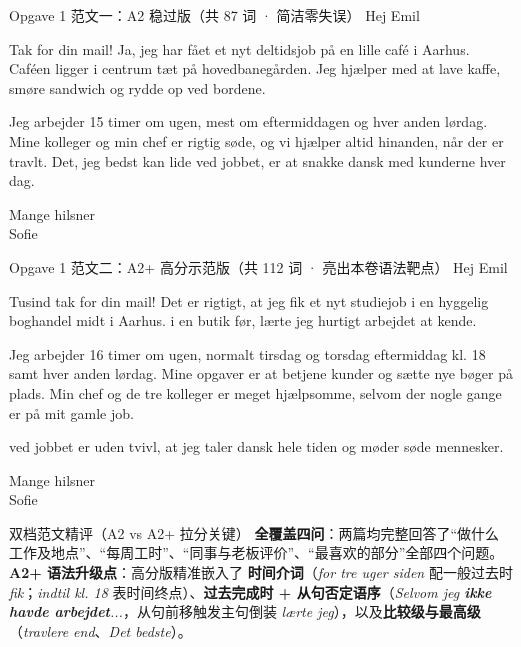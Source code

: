 \begin{emailbox}{Opgave 1 范文一：A2 稳过版（共 87 词 · 简洁零失误）}
Hej Emil

Tak for din mail! Ja, jeg har fået et nyt deltidsjob på en lille café i Aarhus. Caféen ligger i centrum tæt på hovedbanegården. Jeg hjælper med at lave kaffe, smøre sandwich og rydde op ved bordene.

Jeg arbejder 15 timer om ugen, mest om eftermiddagen og hver anden lørdag. Mine kolleger og min chef er rigtig søde, og vi hjælper altid hinanden, når der er travlt. Det, jeg bedst kan lide ved jobbet, er at snakke dansk med kunderne hver dag.

Mange hilsner\\
Sofie
\end{emailbox}

\begin{emailbox}{Opgave 1 范文二：A2+ 高分示范版（共 112 词 · 亮出本卷语法靶点）}
Hej Emil

Tusind tak for din mail! Det er rigtigt, at jeg  fik et nyt studiejob i en hyggelig boghandel midt i Aarhus.  i en butik før, lærte jeg hurtigt arbejdet at kende.

Jeg arbejder 16 timer om ugen, normalt tirsdag og torsdag eftermiddag  kl. 18 samt hver anden lørdag. Mine opgaver er at betjene kunder og sætte nye bøger på plads. Min chef og de tre kolleger er meget hjælpsomme, selvom der nogle gange er  på mit gamle job.

 ved jobbet er uden tvivl, at jeg taler dansk hele tiden og møder søde mennesker.

Mange hilsner\\
Sofie
\end{emailbox}

\begin{tipbox}{双档范文精评（A2 vs A2+ 拉分关键）}
\small
{} \textbf{全覆盖四问}：两篇均完整回答了“做什么工作及地点”、“每周工时”、“同事与老板评价”、“最喜欢的部分”全部四个问题。\\
 \textbf{A2+ 语法升级点}：高分版精准嵌入了 \textbf{时间介词}（\textit{for tre uger siden} 配一般过去时 \textit{fik}；\textit{indtil kl. 18} 表时间终点）、\textbf{过去完成时 + 从句否定语序}（\textit{Selvom jeg \textbf{ikke havde arbejdet}...}，从句前移触发主句倒装 \textit{lærte jeg}），以及\textbf{比较级与最高级}（\textit{travlere end}、\textit{Det bedste}）。
\end{tipbox}

